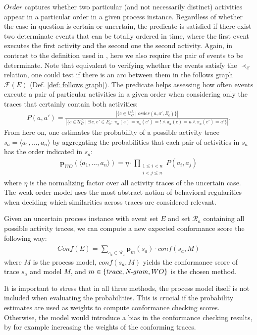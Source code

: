 $Order$
captures whether two particular (and not necessarily distinct) activities appear in a particular order in a given process instance.
Regardless of whether the case in question is certain or uncertain, the predicate is satisfied if there exist two determinate events that can be totally ordered in time, where the first event executes the first activity and the second one the second activity.
Again, in contrast to the definition used in \cite{por}, here we also require the pair of events to be determinate.
Note that equivalent to verifying whether the events satisfy the $\prec_{\mathcal{E}}$ relation, one could test if there is an arc between them in the follows graph $\mathcal{F}(E)$ (Def. \ref{def: follows graph}).
The predicate helps assessing how often events execute a pair of particular activities in a given order when considering only the traces that certainly contain both activities:
\begin{align*}
P(a,a')= \frac{|\{c \in \mathcal{U}_C^L \mid order(a,a',E_c)\}|}
{|\{c \in \mathcal{U}_C^L \mid \exists ~ e,e' \in E_c: ~
\pi_o(e)=\pi_o(e')=! \wedge \pi_a(e)=a \wedge \pi_a(e')=a'\}|}.
\end{align*}
From here on, one estimates the probability of a possible activity trace $s_a=\langle a_1,...,a_n \rangle$ by aggregating the probabilities that each pair of activities in $s_a$ has the order indicated in $s_a$:
\begin{align*}
\textbf{p}_{WO}(\langle a_1,...,a_n \rangle) = \eta \cdot \prod_{
\substack{1 \leq i < n \\ i < j \leq n}}
P(a_i,a_j)
\end{align*}
where $\eta$ is the normalizing factor over all activity traces of the uncertain case.
The weak order model uses the most abstract notion of behavioral regularities when deciding which similarities across traces are considered relevant.

Given an uncertain process instance with event set $E$ and set $\mathcal{R}_a$ containing all possible activity traces, we can compute a new expected conformance score the following way:
\begin{align*}
\overline{Conf}(E) = \sum_{s_a \in \mathcal{R}_a} \textbf{p}_m(s_a) \cdot conf(s_a,M)
\end{align*}
where $M$ is the process model, $conf(s_a,M)$ yields the conformance score of trace $s_a$ and model $M$, and $m \in \{trace, {\text{\textit{N-gram}}}, WO\}$ is the chosen method.

It is important to stress that in all three methods, the process model itself is not included when evaluating the probabilities.
This is crucial if the probability estimates are used as weights to compute conformance checking scores.
Otherwise, the model would introduce a bias in the conformance checking results, by for example increasing the weights of the conforming traces.

